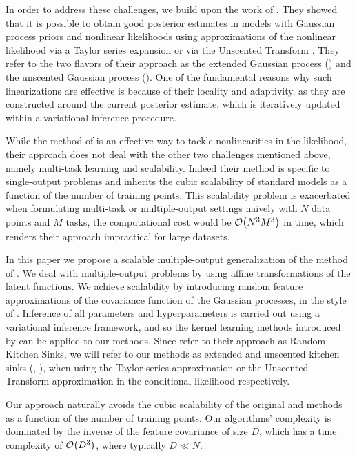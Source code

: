 In order to address these challenges, we build upon the work of
\citet{steinberg-bonilla-nips-2014}. They showed that it is possible to obtain
good posterior estimates in models with Gaussian process priors and nonlinear
likelihoods using  approximations of the nonlinear  likelihood  via a Taylor
series expansion or via the Unscented Transform \citep{Julier2004}.  They refer
to the two  flavors of their approach as the extended Gaussian process (\egp)
and the unscented Gaussian process (\ugp).  One of the fundamental reasons why
such linearizations are effective is because of their locality and adaptivity,
as they are constructed around the current posterior estimate, which is
iteratively updated within a variational inference procedure.

While the method of \citet{steinberg-bonilla-nips-2014} is an effective way to
tackle nonlinearities in the likelihood, their approach  does not deal with the
other two challenges mentioned above, namely multi-task learning and
scalability. Indeed their method is specific to single-output problems and
inherits the cubic scalability of standard \gp models as a function of the
number of training points. This scalability problem is exacerbated when
formulating  multi-task or multiple-output settings naively with $N$ data
points and $M$ tasks, the computational cost would be $\mathcal{O}\!\left({{N^3M^3}}\right)$ in
time, which renders their approach impractical for large datasets.  

In this paper we propose a scalable multiple-output generalization  of the
method of \citet{steinberg-bonilla-nips-2014}. We deal with multiple-output
problems by using affine transformations of the latent functions. We achieve
scalability by introducing random feature approximations of the covariance
function of the Gaussian processes, in the style of
\citet{rahimi-recht-nips-2007}. Inference of all parameters and hyperparameters
is carried out using a variational inference framework, and so the kernel
learning methods introduced by \citet{yang-et-al-aistats-2015} can be
applied to our methods. Since \citet{rahimi-recht-nips-2007} refer to their
approach as Random Kitchen Sinks, we will refer to our methods as extended and
unscented kitchen sinks (\eks, \uks), when using the Taylor series
approximation or the Unscented Transform approximation in the conditional
likelihood respectively. 

Our approach naturally avoids the cubic scalability of the original \egp and
\ugp methods \citep{steinberg-bonilla-nips-2014} as a function of the number of
training points. Our algorithms' complexity is dominated by the inverse of the
feature covariance of size $D$, which has a time complexity of $\mathcal{O}\!\left({{D^3}}\right)$,
where typically $D \ll N$. 

